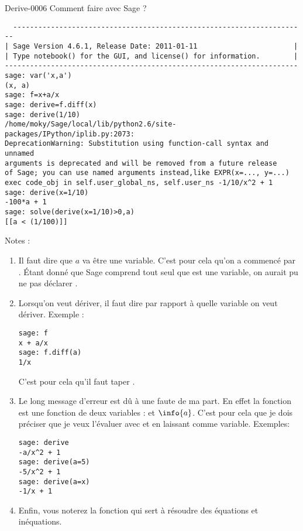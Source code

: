 \begin{corrige}{Derive-0006}
    Comment faire avec Sage ?
    \begin{verbatim}
  ----------------------------------------------------------------------
| Sage Version 4.6.1, Release Date: 2011-01-11                       |
| Type notebook() for the GUI, and license() for information.        |
----------------------------------------------------------------------
sage: var('x,a')
(x, a)
sage: f=x+a/x
sage: derive=f.diff(x)
sage: derive(1/10)
/home/moky/Sage/local/lib/python2.6/site-packages/IPython/iplib.py:2073: 
DeprecationWarning: Substitution using function-call syntax and unnamed
arguments is deprecated and will be removed from a future release
of Sage; you can use named arguments instead,like EXPR(x=..., y=...)
exec code_obj in self.user_global_ns, self.user_ns -1/10/x^2 + 1
sage: derive(x=1/10)
-100*a + 1
sage: solve(derive(x=1/10)>0,a)
[[a < (1/100)]]
    \end{verbatim}
    Notes :
    \begin{enumerate}
        \item
            Il faut dire que $a$ va être une variable. C'est pour cela qu'on a commencé par . Étant donné que Sage comprend tout seul que  est une variable, on aurait pu ne pas déclarer .
        \item
            Lorsqu'on veut dériver, il faut dire par rapport à quelle variable on veut dériver. Exemple :
            \begin{verbatim}
sage: f
x + a/x
sage: f.diff(a)
1/x
            \end{verbatim}
            C'est pour cela qu'il faut taper .
        \item
            Le long message d'erreur  est dû à une faute de ma part. En effet la fonction  est une fonction de deux variables :  et $\info{a}$. C'est pour cela que je dois préciser que je veux l'évaluer avec  et en laissant  comme variable. Exemples:
            \begin{verbatim}
sage: derive
-a/x^2 + 1
sage: derive(a=5)
-5/x^2 + 1
sage: derive(a=x)
-1/x + 1
            \end{verbatim}
        \item
            Enfin, vous noterez la fonction  qui sert à résoudre des équations et inéquations.

    \end{enumerate}

\end{corrige}

